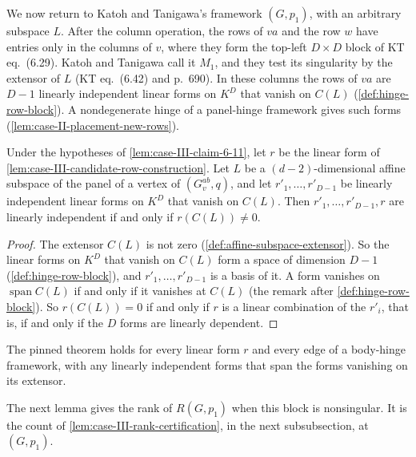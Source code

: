 We now return to Katoh and Tanigawa's framework $(G, p_1)$, with an
arbitrary subspace $L$. After the column operation, the rows of $va$ and
the row $w$ have entries only in the columns of $v$, where they form the
top-left $D \times D$ block of KT eq.~(6.29). Katoh and Tanigawa call it
$M_1$, and they test its singularity by the extensor of $L$ (KT
eq.~(6.42) and p.~690). In these columns the rows of $va$ are $D - 1$
linearly independent linear forms on $K^D$ that vanish on $C(L)$
(\cref{def:hinge-row-block}). A nondegenerate hinge of a panel-hinge
framework gives such forms (\cref{lem:case-II-placement-new-rows}).

\begin{lemma}
  \label{lem:case-III-claim612-block-iff-perp}
  \leanok
  Under the hypotheses of \cref{lem:case-III-claim-6-11}, let $r$ be
  the linear form of \cref{lem:case-III-candidate-row-construction}.
  Let $L$ be a $(d-2)$-dimensional affine subspace of the panel of a
  vertex of $(G_v^{ab}, q)$, and let $r'_1, \dots, r'_{D-1}$ be linearly
  independent linear forms on $K^D$ that vanish on $C(L)$. Then
  $r'_1, \dots, r'_{D-1}, r$ are linearly independent if and only if
  $r(C(L)) \neq 0$.
\end{lemma}
\begin{proof}
  \leanok
  The extensor $C(L)$ is not zero (\cref{def:affine-subspace-extensor}).
  So the linear forms on $K^D$ that vanish on $C(L)$ form a space of
  dimension $D - 1$ (\cref{def:hinge-row-block}), and
  $r'_1, \dots, r'_{D-1}$ is a basis of it. A form vanishes on
  $\operatorname{span} C(L)$ if and only if it vanishes at $C(L)$ (the
  remark after \cref{def:hinge-row-block}). So
  $r(C(L)) = 0$ if and only if $r$ is a linear combination of the
  $r'_i$, that is, if and only if the $D$ forms are linearly
  dependent.
\end{proof}

\begin{fmlnote}
  The pinned theorem holds for every linear form $r$ and every edge of
  a body-hinge framework, with any linearly independent forms that span
  the forms vanishing on its extensor.
\end{fmlnote}

The next lemma gives the rank of $R(G, p_1)$ when this block is
nonsingular. It is the count of \cref{lem:case-III-rank-certification},
in the next subsubsection, at $(G, p_1)$.

